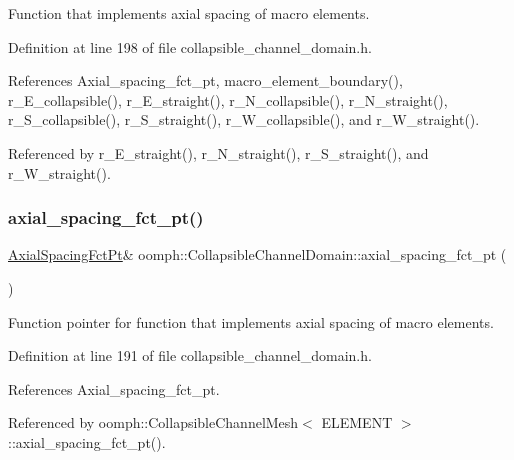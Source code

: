 Function that implements axial spacing of macro elements. 



Definition at line 198 of file collapsible\+\_\+channel\+\_\+domain.\+h.



References Axial\+\_\+spacing\+\_\+fct\+\_\+pt, macro\+\_\+element\+\_\+boundary(), r\+\_\+\+E\+\_\+collapsible(), r\+\_\+\+E\+\_\+straight(), r\+\_\+\+N\+\_\+collapsible(), r\+\_\+\+N\+\_\+straight(), r\+\_\+\+S\+\_\+collapsible(), r\+\_\+\+S\+\_\+straight(), r\+\_\+\+W\+\_\+collapsible(), and r\+\_\+\+W\+\_\+straight().



Referenced by r\+\_\+\+E\+\_\+straight(), r\+\_\+\+N\+\_\+straight(), r\+\_\+\+S\+\_\+straight(), and r\+\_\+\+W\+\_\+straight().

\mbox{\label{classoomph_1_1CollapsibleChannelDomain_a17bfb9fe218dc539669bdbdf0ecc4bf8}} 
\subsubsection{\texorpdfstring{axial\+\_\+spacing\+\_\+fct\+\_\+pt()}{axial\_spacing\_fct\_pt()}}
{\footnotesize\ttfamily \hyperlink{classoomph_1_1CollapsibleChannelDomain_a317472dab112beac771ecf6442a465f5}{Axial\+Spacing\+Fct\+Pt}\& oomph\+::\+Collapsible\+Channel\+Domain\+::axial\+\_\+spacing\+\_\+fct\+\_\+pt (\begin{DoxyParamCaption}{ }\end{DoxyParamCaption})\hspace{0.3cm}{\ttfamily [inline]}}



Function pointer for function that implements axial spacing of macro elements. 



Definition at line 191 of file collapsible\+\_\+channel\+\_\+domain.\+h.



References Axial\+\_\+spacing\+\_\+fct\+\_\+pt.



Referenced by oomph\+::\+Collapsible\+Channel\+Mesh$<$ E\+L\+E\+M\+E\+N\+T $>$\+::axial\+\_\+spacing\+\_\+fct\+\_\+pt().

